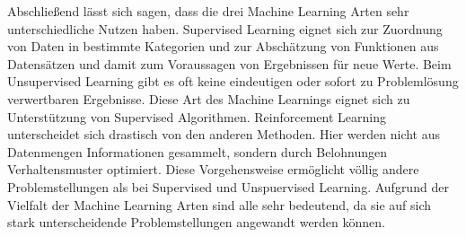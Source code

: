 	Abschließend lässt sich sagen, dass die drei Machine Learning Arten sehr unterschiedliche Nutzen haben.
	Supervised Learning eignet sich zur Zuordnung von Daten in bestimmte Kategorien und zur Abschätzung von Funktionen aus Datensätzen und damit zum Voraussagen von Ergebnissen für neue Werte. Beim Unsupervised Learning gibt es oft keine eindeutigen oder sofort zu Problemlösung verwertbaren Ergebnisse. Diese Art des Machine Learnings eignet sich zu Unterstützung von Supervised Algorithmen. Reinforcement Learning unterscheidet sich drastisch von den anderen Methoden. Hier werden nicht aus Datenmengen Informationen gesammelt, sondern durch Belohnungen Verhaltensmuster optimiert. Diese Vorgehensweise ermöglicht völlig andere Problemstellungen als bei Supervised und Unspuervised Learning. Aufgrund der Vielfalt der Machine Learning Arten sind alle sehr bedeutend, da sie auf sich stark unterscheidende Problemstellungen angewandt werden können.
	